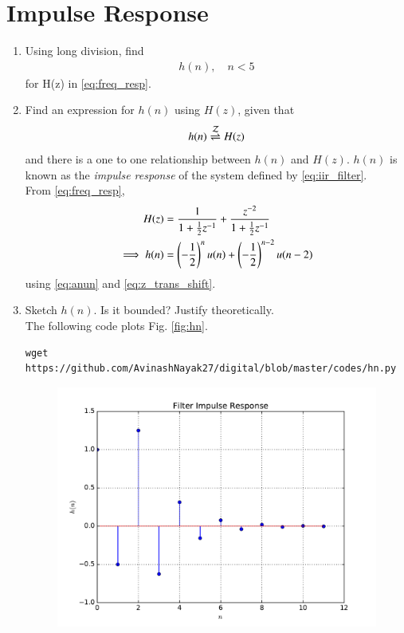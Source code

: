 \documentclass[journal,12pt,twocolumn]{IEEEtran}
\renewcommand\thesection{\arabic{section}}
\begin{document}
\section{Impulse Response}
\begin{enumerate}[label=\thesection.\arabic*]
	\item Using long division, 
find
		\begin{align}
			h(n), \quad n < 5
		\end{align}
		for H(z) in 
		\eqref{eq:freq_resp}.
\item \label{prob:impulse_resp}
Find an expression for $h(n)$ using $H(z)$, given that 
\begin{equation}
\label{eq:impulse_resp}
h(n) \overset{\mathcal{Z}}{ \rightleftharpoons} H(z)
\end{equation}
and there is a one to one relationship between $h(n)$ and $H(z)$. $h(n)$ is known as the {\em impulse response} of the
system defined by \eqref{eq:iir_filter}.
\\
\solution From \eqref{eq:freq_resp},
\begin{align}
H(z) &= \frac{1}{1 + \frac{1}{2}z^{-1}} + \frac{ z^{-2}}{1 + \frac{1}{2}z^{-1}}
\\
\implies h(n) &= \left(-\frac{1}{2}\right)^{n}u(n) + \left(-\frac{1}{2}\right)^{n-2}u(n-2)
\end{align}
using \eqref{eq:anun} and \eqref{eq:z_trans_shift}.
\item Sketch $h(n)$. Is it bounded? Justify theoretically.
\\
\solution The following code plots Fig. \ref{fig:hn}.
\begin{lstlisting}
wget https://github.com/AvinashNayak27/digital/blob/master/codes/hn.py
\end{lstlisting}
\begin{figure}[!ht]
\centering
\includegraphics[width=\columnwidth]{./figs/hn}

\end{figure}
\end{enumerate}
\end{document}

